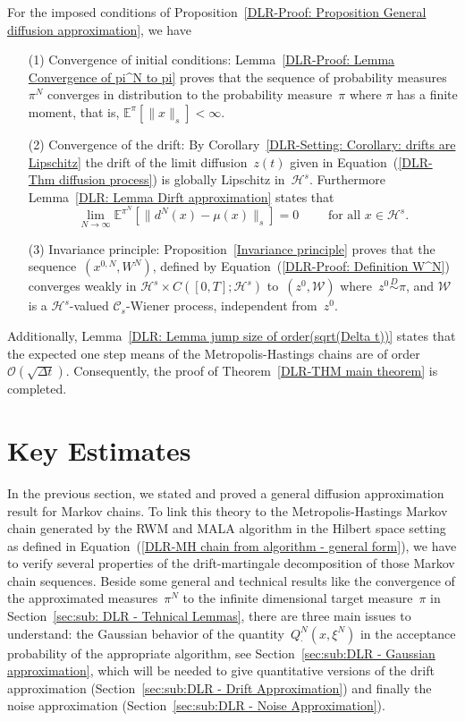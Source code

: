 For the imposed conditions of Proposition~\ref{DLR-Proof: Proposition General diffusion approximation}, we have
 \begin{enumerate}
    \item[(1)] Convergence of initial conditions: Lemma~\ref{DLR-Proof: Lemma Convergence of pi^N to pi} proves that the sequence of probability measures~$\pi^N$ converges in distribution to the probability measure~$\pi$ where $\pi$ has a finite moment, that is, $\mathbb{E}^{\pi}[\|x\|_s]<\infty$. 
    \item[(2)] Convergence of the drift: By Corollary~\ref{DLR-Setting: Corollary: drifts are Lipschitz} the drift of the limit diffusion~$z(t)$ given in Equation~(\ref{DLR-Thm diffusion process}) is globally Lipschitz in~$\mathcal{H}^s$. Furthermore Lemma~\ref{DLR: Lemma Dirft approximation} states that 
    \begin{equation*}
      \lim_{N \to \infty} \mathbb{E}^{\pi^N}[ \|  d^N(x) - \mu(x) \|_{s} ] = 0 \qquad \text{ for all } x \in \mathcal{H}^s.
    \end{equation*}
    \item[(3)] Invariance principle: Proposition~\ref{Invariance principle} proves that the sequence~$(x^{0,N}, W^N)$, defined by Equation~(\ref{DLR-Proof: Definition W^N}) converges weakly in $\mathcal{H}^s \times C([0,T]; \mathcal{H}^s)$ to~$(z^0, \mathcal{W})$ where~$z^0 \stackrel{D}{\sim} \pi$, and $\mathcal{W}$ is a $\mathcal{H}^s$-valued $\mathcal{C}_s$-Wiener process, independent from~$z^0$.
  \end{enumerate}
Additionally, Lemma~\ref{DLR: Lemma jump size of order(sqrt(Delta t))} states that the expected one step means of the Metropolis-Hastings chains are of order~$\mathcal{O}(\sqrt{\Delta t})$. Consequently, the proof of Theorem~\ref{DLR-THM main theorem} is completed.



\section{Key Estimates}
\label{sec:DLR-Estimates}

In the previous section, we stated and proved a general diffusion approximation result for Markov chains. To link this theory to the Metropolis-Hastings Markov chain generated by the RWM and MALA algorithm in the Hilbert space setting as defined in Equation~(\ref{DLR-MH chain from algorithm - general form}), we have to verify several properties of the drift-martingale decomposition of those Markov chain sequences. Beside some general and technical results like the convergence of the approximated measures~$\pi^N$ to the infinite dimensional target measure~$\pi$ in Section~\ref{sec:sub: DLR - Tehnical Lemmas}, there are three main issues to understand: the Gaussian behavior of the quantity~$Q^{N}_{\cdot}(x, \xi^N)$ in the acceptance probability of the appropriate algorithm, see Section~\ref{sec:sub:DLR - Gaussian approximation}, which will be needed to give quantitative versions of the drift approximation (Section~\ref{sec:sub:DLR - Drift Approximation}) and finally the noise approximation (Section~\ref{sec:sub:DLR - Noise Approximation}).

